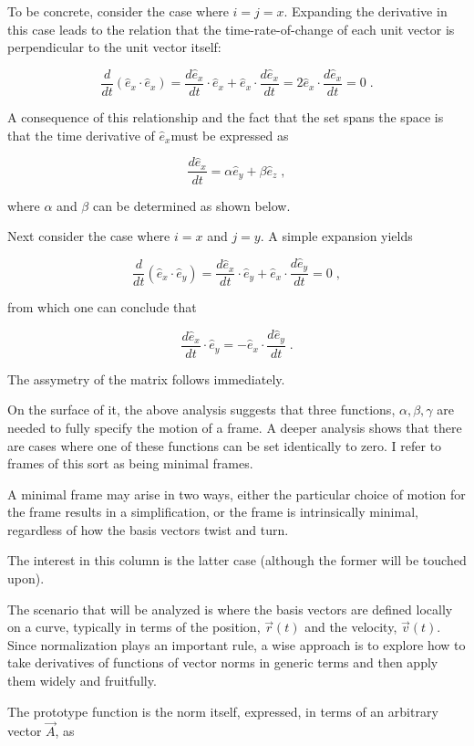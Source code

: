 \documentclass[10pt]{article}
\begin{document}
To be concrete, consider the case where $i=j=x$.  Expanding the derivative in this case leads to the relation that the time-rate-of-change of each unit vector is perpendicular to the unit vector itself:

\[ \frac{d}{dt} \left(\hat e_x \cdot \hat e_x \right) = \frac{d \hat e_x}{dt} \cdot \hat e_x + \hat e_x \cdot \frac{d \hat e_x}{dt} = 2 \hat e_x \cdot \frac{d \hat e_x}{dt} = 0\; .\]  

A consequence of this relationship and the fact that the set spans the space is that the time derivative of $\hat e_x$must be expressed as 

\[\frac{d \hat e_x}{dt} = \alpha \hat e_y + \beta \hat e_z  \; , \]

where $\alpha$ and $\beta$ can be determined as shown below.

Next consider the case where $i=x$ and $j=y$.  A simple expansion yields

\[\frac{d}{dt}\left( \hat e_x \cdot \hat e_y \right) = \frac{d \hat e_x}{dt} \cdot \hat e_y + \hat e_x \cdot \frac{d \hat e_y}{dt} = 0 \; ,\]

from which one can conclude that

\[ \frac{d \hat e_x}{dt} \cdot \hat e_y = - \hat e_x \cdot \frac{d \hat e_y}{dt} \; .\]

The assymetry of the matrix follows immediately.

On the surface of it, the above analysis suggests that three functions, $\alpha, \beta, \gamma$ are needed to fully specify the motion of a frame.  A deeper analysis shows that there are cases where one of these functions can be set identically to zero.  I refer to frames of this sort as being minimal frames.

A minimal frame may arise in two ways, either the particular choice of motion for the frame results in a simplification, or the frame is intrinsically minimal, regardless of how the basis vectors twist and turn. 

The interest in this column is the latter case (although the former will be touched upon). 

The scenario that will be analyzed is where the basis vectors are defined locally on a curve, typically in terms of the position, $\vec r(t)$ and the velocity, $\vec v(t)$.  Since normalization plays an important rule, a wise approach is to explore how to take derivatives of functions of vector norms in generic terms and then apply them widely and fruitfully.

The prototype function is the norm itself, expressed, in terms of an arbitrary vector $\vec A$, as 
\end{document}
